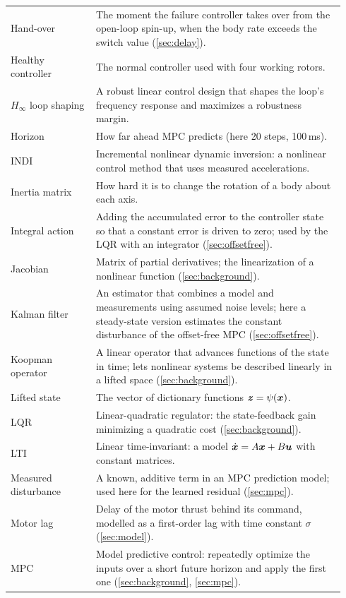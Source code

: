 \begin{longtable}{p{0.24\linewidth}p{0.70\linewidth}}
Hand-over & The moment the failure controller takes over from the open-loop spin-up, when the body rate exceeds the switch value (\ref{sec:delay}). \\
Healthy controller & The normal controller used with four working rotors. \\
$H_\infty$ loop shaping & A robust linear control design that shapes the loop's frequency response and maximizes a robustness margin. \\
Horizon & How far ahead MPC predicts (here 20 steps, 100\,ms). \\
INDI & Incremental nonlinear dynamic inversion: a nonlinear control method that uses measured accelerations. \\
Inertia matrix & How hard it is to change the rotation of a body about each axis. \\
Integral action & Adding the accumulated error to the controller state so that a constant error is driven to zero; used by the LQR with an integrator (\ref{sec:offsetfree}). \\
Jacobian & Matrix of partial derivatives; the linearization of a nonlinear function (\ref{sec:background}). \\
Kalman filter & An estimator that combines a model and measurements using assumed noise levels; here a steady-state version estimates the constant disturbance of the offset-free MPC (\ref{sec:offsetfree}). \\
Koopman operator & A linear operator that advances functions of the state in time; lets nonlinear systems be described linearly in a lifted space (\ref{sec:background}). \\
Lifted state & The vector of dictionary functions $\boldsymbol{z} = \psi(\boldsymbol{x})$. \\
LQR & Linear-quadratic regulator: the state-feedback gain minimizing a quadratic cost (\ref{sec:background}). \\
LTI & Linear time-invariant: a model $\dot{\boldsymbol{x}} = A\boldsymbol{x} + B\boldsymbol{u}$ with constant matrices. \\
Measured disturbance & A known, additive term in an MPC prediction model; used here for the learned residual (\ref{sec:mpc}). \\
Motor lag & Delay of the motor thrust behind its command, modelled as a first-order lag with time constant $\sigma$ (\ref{sec:model}). \\
MPC & Model predictive control: repeatedly optimize the inputs over a short future horizon and apply the first one (\ref{sec:background}, \ref{sec:mpc}). \\

\end{longtable}
